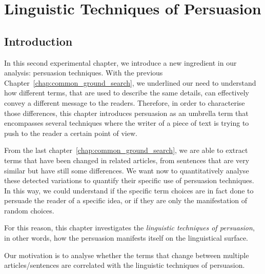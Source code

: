 \chapter{\statusgreen Linguistic Techniques of Persuasion}
\label{chap:linguistic_persuasion}

\section{\statusgreen Introduction}
\label{sec:lp_intro}

In this second experimental chapter, we introduce a new ingredient in our analysis: persuasion techniques.
With the previous Chapter~\ref{chap:common_ground_search}, we underlined our need to understand how different terms, that are used to describe the same details, can effectively convey a different message to the readers.
Therefore, in order to characterise those differences, this chapter introduces \gls{persuasion} as an umbrella term that encompasses several techniques where the writer of a piece of text is trying to push to the reader a certain point of view.

From the last chapter~\ref{chap:common_ground_search}, 
we are able to extract terms that have been changed in related articles, from sentences that are very similar but have still some differences.
We want now to quantitatively analyse these detected variations to quantify their specific use of persuasion techniques.
In this way, we could understand if the specific term choices are in fact done to persuade the reader of a specific idea, or if they are only the manifestation of random choices.

For this reason, this chapter investigates the \emph{linguistic techniques of persuasion}, in other words, how the persuasion manifests itself on the linguistical surface.

Our motivation is to analyse whether the terms that change between multiple articles/sentences are correlated with the linguistic techniques of persuasion.

